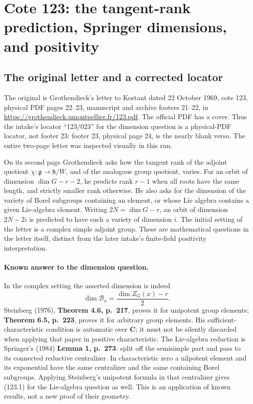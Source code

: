 \section{Cote 123: the tangent-rank prediction, Springer dimensions, and positivity}
\label{sec:cote123}

\subsection{The original letter and a corrected locator}
The original is Grothendieck's letter to Kostant dated 22 October 1969,
cote 123, physical PDF pages 22--23, manuscript and archive footers
21--22, in \url{https://grothendieck.umontpellier.fr/123.pdf}.
The official PDF has a cover. Thus the intake's locator ``123/023''
for the dimension question is a physical-PDF locator, not footer 23:
footer 23, physical page 24, is the nearly blank verso.
The entire two-page letter was inspected visually in this run.

On its second page Grothendieck asks how the tangent rank of the
adjoint quotient \(\chi:\mathfrak g\to\mathfrak h/W\), and of
the analogous group quotient, varies. For an orbit of dimension
\(\dim G-r-2\), he predicts rank \(r-1\) when all roots have
the same length, and strictly smaller rank otherwise. He also asks
for the dimension of the variety of Borel subgroups containing an
element, or whose Lie algebra contains a given Lie-algebra element.
Writing \(2N=\dim G-r\), an orbit of dimension \(2N-2i\)
is predicted to have such a variety of dimension \(i\).
The initial setting of the letter is a complex simple adjoint group.
These are mathematical questions in the letter itself, distinct
from the later intake's finite-field positivity interpretation.

\paragraph{Known answer to the dimension question.}
In the complex setting the asserted dimension is indeed
\[
 \dim\mathcal B_x=\frac{\dim Z_G(x)-r}{2}.
 \tag{123.1}
\]
Steinberg (1976), \textbf{Theorem 4.6, p.~217}, proves it for
unipotent group elements; \textbf{Theorem 6.5, p.~223}, proves
it for arbitrary group elements. His sufficient-characteristic
condition is automatic over \(\mathbf C\); it must not be
silently discarded when applying that paper in positive
characteristic. The Lie-algebra reduction is Springer's (1984)
\textbf{Lemma 1, p.~273}: split off the semisimple part and
pass to its connected reductive centralizer. In characteristic
zero a nilpotent element and its exponential have the same
centralizer and the same containing Borel subgroups. Applying
Steinberg's unipotent formula in that centralizer gives (123.1)
for the Lie-algebra question as well. This is an application
of known results, not a new proof of their geometry.

